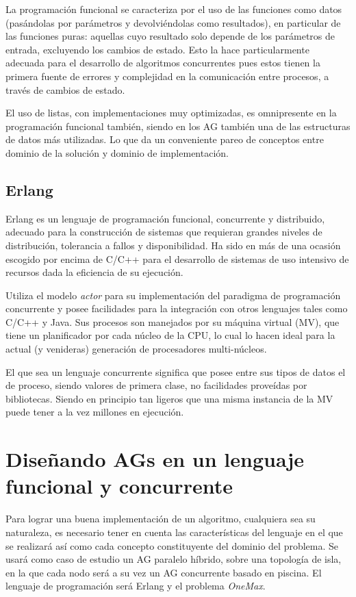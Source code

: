 \documentclass[runningheads]{llncs}
\begin{document}
La programación funcional se caracteriza por el uso de las funciones como datos (pasándolas por parámetros y devolviéndolas como resultados), en particular de las funciones puras: aquellas cuyo resultado solo depende de los parámetros de entrada, excluyendo los cambios de estado. Esto la hace particularmente adecuada para el desarrollo de algoritmos concurrentes pues estos tienen la primera fuente de errores y complejidad en la comunicación entre procesos, a través de cambios de estado.

El uso de listas, con implementaciones muy optimizadas, es omnipresente en la programación funcional también, siendo en los AG también una de las estructuras de datos más utilizadas. Lo que da un conveniente pareo de conceptos entre dominio de la solución y dominio de implementación.

\subsection{Erlang}


Erlang es un lenguaje de programación funcional, concurrente y distribuido, adecuado para la construcción de sistemas que requieran grandes niveles de distribución, tolerancia a fallos y disponibilidad. Ha sido en más de una ocasión escogido por encima de C/C++ para el desarrollo de sistemas de uso intensivo de recursos \cite{Cesarini2009} dada la eficiencia de su ejecución.

Utiliza el modelo {\em actor} para su implementación del paradigma de programación concurrente y posee facilidades para la integración con otros lenguajes tales como C/C++ y Java. Sus procesos son manejados por su máquina virtual (MV), que tiene un planificador por cada núcleo de la CPU, lo cual lo hacen ideal para la actual (y venideras) generación de procesadores multi-núcleos.

El que sea un lenguaje concurrente significa que posee entre sus tipos de datos el de proceso, siendo valores de primera clase, no facilidades proveídas por bibliotecas. Siendo en principio tan ligeros que una misma instancia de la MV puede tener a la vez millones en ejecución.

\section{Diseñando AGs en un lenguaje funcional y concurrente}
\label{sec:design}

Para lograr una buena implementación de un algoritmo, cualquiera sea su naturaleza, es necesario tener en cuenta las características del lenguaje en el que se realizará así como cada concepto constituyente del dominio del problema. Se usará como caso de estudio un AG paralelo híbrido, sobre una topología de isla, en la que cada nodo será a su vez un AG concurrente basado en piscina. El lenguaje de programación será Erlang y el problema {\em OneMax}.
\end{document}
